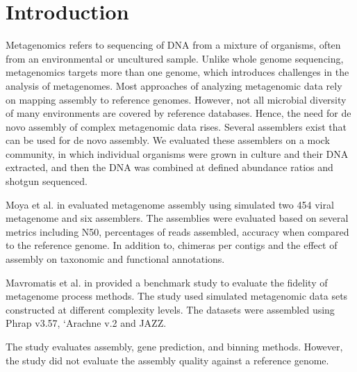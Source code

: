 \documentclass[10pt,a4paper,twocolumn]{article}
\begin{document}
\clearpage

\section*{Introduction}

Metagenomics refers to sequencing of DNA from a mixture of organisms, often from an environmental or uncultured sample. Unlike whole genome sequencing, metagenomics targets more than one genome, which introduces challenges in the analysis of metagenomes.  Most approaches of analyzing metagenomic data rely on mapping assembly to reference genomes. However, not all microbial diversity of many environments are covered by reference databases. Hence, the need for de novo assembly of complex metagenomic data rises. Several assemblers exist that can be used for de novo assembly.  We evaluated these assemblers on a mock community, in which individual organisms were grown in culture and their DNA extracted, and then the DNA was combined at defined abundance ratios and shotgun sequenced.

 
 
 Moya et al. in \cite{moya2014} evaluated metagenome assembly using simulated two 454 viral metagenome and six assemblers. The assemblies were evaluated based on several metrics including N50, percentages of reads assembled, accuracy when compared to the reference genome. In addition to, chimeras per contigs and the effect of assembly on taxonomic and functional annotations. 
 
Mavromatis et al. in \cite{mavromatis2007} provided a benchmark study to evaluate the fidelity of metagenome process methods. The study used simulated metagenomic data sets constructed at different complexity levels. 
The datasets were assembled using Phrap v3.57, `Arachne v.2 \cite{arachne} and JAZZ. \cite{jazz} 

The study evaluates  assembly, gene prediction, and binning methods. However, the study did not evaluate the assembly quality against a reference genome.
\end{document}
